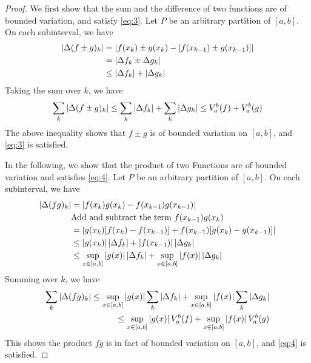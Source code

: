 \documentclass[thmcnt=section, color=blue, 12pt]{my-elegantbook}
\begin{document}
\begin{proof}
	We first show that the sum and the difference of two functions
	are of bounded variation, and satisfy \eqref{eq:3}.
	Let $P$ be an arbitrary partition of $[a, b]$.
	On each subinterval, we have
	\begin{align*}
		\left\lvert \Delta (f \pm g)_k \right\rvert
		 & = \left\lvert f(x_{k}) \pm g(x_{k}) - [f(x_{k-1}) \pm g(x_{k-1})] \right\rvert \\
		 & = \left\lvert \Delta f_k \pm \Delta g_k \right\rvert                           \\
		 & \leq \left\lvert \Delta f_k \right\rvert + \left\lvert \Delta g_k \right\rvert
	\end{align*}
	Taking the sum over $k$, we have
	\begin{align*}
		\sum_{k} \left\lvert \Delta (f \pm g)_k \right\rvert
		\leq \sum_{k} \left\lvert \Delta f_k \right\rvert + \sum_k \left\lvert \Delta g_k \right\rvert
		\leq V_a^b (f) + V_a^b (g)
	\end{align*}
	The above inequality shows that $f \pm g$ is of bounded variation on $[a, b]$,
	and \eqref{eq:3} is satisfied.

	In the following, we show that the product of two Functions
	are of bounded variation and satisfies \eqref{eq:4}.
	Let $P$ be an arbitrary partition of $[a, b]$.
	On each subinterval, we have
	\begin{align*}
		\left\lvert \Delta (fg)_k \right\rvert
		 & = \left\lvert f(x_{k}) g(x_{k}) - f(x_{k-1}) g(x_{k-1}) \right\rvert                                \\
		 & \text{Add and subtract the term $f(x_{k-1})g(x_{k})$}                            \\
		 & = \left\lvert  g(x_{k})[ f(x_{k}) - f(x_{k-1})] + f(x_{k-1})[ g(x_{k}) - g(x_{k-1}) ]  \right\rvert \\
		 & \leq \left\lvert g(x_{k}) \right\rvert \left\lvert \Delta f_k \right\rvert + \left\lvert f(x_{k-1}) \right\rvert \left\lvert  \Delta g_k  \right\rvert       \\
		 & \leq \sup_{x \in [a, b]} \left\lvert g(x) \right\rvert \left\lvert \Delta f_k \right\rvert
		+ \sup_{x \in [a, b]} \left\lvert f(x) \right\rvert \left\lvert \Delta g_k \right\rvert
	\end{align*}
	Summing over $k$, we have
	\begin{align*}
		\sum_k \left\lvert \Delta (fg)_k \right\rvert
		\leq \sup_{x \in [a, b]} \left\lvert g(x) \right\rvert \sum_k \left\lvert \Delta f_k \right\rvert
		+ \sup_{x \in [a, b]} \left\lvert f(x) \right\rvert \sum_k \left\lvert \Delta g_k \right\rvert \\
		\leq  \sup_{x \in [a, b]} \left\lvert g(x) \right\rvert V_a^b (f)
		+ \sup_{x \in [a, b]} \left\lvert f(x) \right\rvert V_a^b (g)
	\end{align*}
	This shows the product $fg$ is in fact of bounded variation on $[a, b]$,
	and \eqref{eq:4} is satisfied.
\end{proof}
\end{document}
